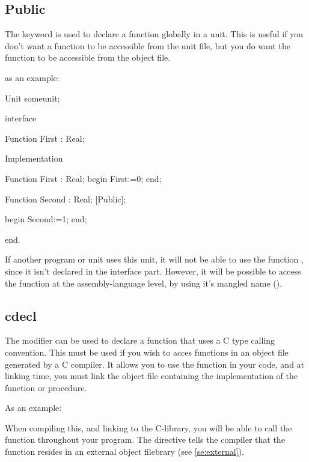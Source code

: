 \documentclass{report}
\begin{document}
\subsection{Public}
The  keyword is used to declare a function globally in a unit.
This is useful if you don't want a function to be accessible from the unit
file, but you do want the function to be accessible from the object file.

as an example:
\begin{listing}
Unit someunit;

interface

Function First : Real;

Implementation

Function First : Real;
begin
  First:=0;
end;

Function Second : Real; [Public];

begin
  Second:=1;
end;

end.
\end{listing} 
If another program or unit uses this unit, it will not be able to use the
function , since it isn't declared in the interface part.
However, it will be possible to access the function  at the
assembly-language level, by using it's mangled name (\progref).

\subsection{cdecl}
\label{se:cdecl}
The  modifier can be used to declare a function that uses a C
type calling convention. This must be used if you wish to acces functions in
an object file generated by a C compiler. It allows you to use the function in
your code, and at linking time, you must link the object file containing the
 implementation of the function or procedure.

As an example:
When compiling this, and linking to the C-library, you will be able to call
the  function throughout your program. The 
directive tells the compiler that the function resides in an external
object filebrary (see \ref{se:external}). 
\end{document}
